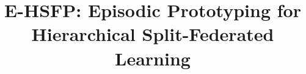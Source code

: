 \documentclass[journal]{IEEEtai}
\begin{document}
\title{E-HSFP: Episodic Prototyping for Hierarchical Split-Federated Learning} 



\maketitle













\clearpage
\appendices

\end{document}
